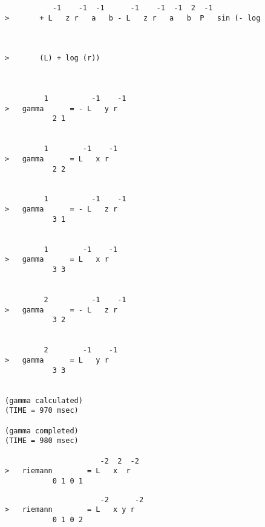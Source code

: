\begin{verbatim}
           -1    -1  -1      -1    -1  -1  2  -1
>       + L   z r   a   b - L   z r   a   b  P   sin (- log



>       (L) + log (r))



         1          -1    -1
>   gamma      = - L   y r
           2 1


         1        -1    -1
>   gamma      = L   x r
           2 2


         1          -1    -1
>   gamma      = - L   z r
           3 1


         1        -1    -1
>   gamma      = L   x r
           3 3


         2          -1    -1
>   gamma      = - L   z r
           3 2


         2        -1    -1
>   gamma      = L   y r
           3 3


(gamma calculated)
(TIME = 970 msec)

(gamma completed)
(TIME = 980 msec)

                      -2  2  -2
>   riemann        = L   x  r
           0 1 0 1

\end{verbatim}
{\samepage
\begin{verbatim}
                      -2      -2
>   riemann        = L   x y r
           0 1 0 2
\end{verbatim}
       }
